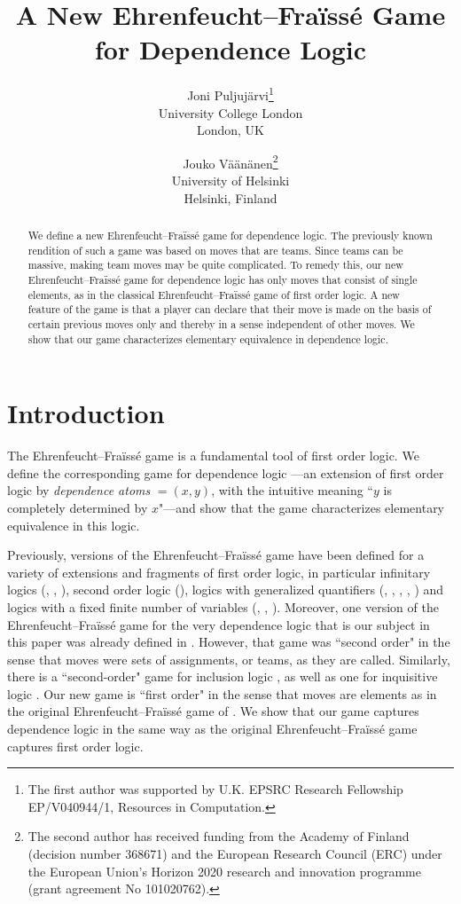 \documentclass[12pt]{article}
\title{A New Ehrenfeucht--Fraïssé Game for Dependence Logic}
\author{Joni Puljujärvi\thanks{The first author was supported by U.K. EPSRC Research Fellowship EP/V040944/1, Resources in Computation.}\\University College London\\ London, UK \and  Jouko Väänänen\thanks{The second author has received funding from the Academy of Finland (decision number 368671) and the European Research Council (ERC) under the European Union’s Horizon 2020 research and innovation programme (grant agreement No 101020762).}\\ University of Helsinki\\ Helsinki, Finland}
\theoremstyle{definition}
\newcommand{\dep}{\mathop{=}}
\begin{document}
\maketitle

\begin{abstract}
    We define a new Ehrenfeucht--Fraïssé game for dependence logic. The previously known rendition of such a game  was based on moves that are teams. Since teams can be massive, making team moves  may be quite complicated. To remedy this, our new Ehrenfeucht--Fraïssé game for dependence logic has only moves that consist of single elements, as in the classical Ehrenfeucht--Fraïssé game of first order logic. A new feature of the game is that a player can declare that their move is made on the basis of certain previous moves only and thereby in a sense  independent of other moves. We show that our game characterizes elementary equivalence in dependence logic.
\end{abstract}

\section{Introduction}

The Ehrenfeucht--Fraïssé game \cite{MR126370} is a fundamental tool of first order logic. We define the corresponding game for dependence logic \cite{MR2351449}---an extension of first order logic by \emph{dependence atoms} $\dep(x,y)$, with the intuitive meaning ``$y$ is completely determined by $x$"---and show that the game characterizes elementary equivalence in this logic.

Previously, versions of the Ehrenfeucht--Fraïssé game have been defined for a variety of extensions and fragments of first order logic, in particular infinitary logics (\cite{MR209132}, \cite{MR252208}, \cite{MR292656}), second order logic (\cite{MR191791}), logics with generalized quantifiers (\cite{MR314591}, \cite{MR427043}, \cite{MR462912}, \cite{MR597058}, \cite{MR1336413}) and logics with a fixed finite number of variables (\cite{MR685362}, \cite{MR666822}, \cite{MR1167033}). Moreover, one version of the  Ehrenfeucht--Fraïssé game for the very dependence logic that is our subject in this paper  was already defined in \cite{MR2351449}. However, that game was ``second order" in the sense that moves were sets of assignments, or teams, as they are called. Similarly, there is a ``second-order" game for inclusion logic \cite{MR3111746}, as well as one for inquisitive logic \cite{GRILLETTI_CIARDELLI_2023}. Our new game is ``first order" in the sense that moves are elements as in the original Ehrenfeucht--Fraïssé game of \cite{MR126370}. We show that our game captures dependence logic in the same way as the original Ehrenfeucht--Fraïssé game captures first order logic.
\end{document}
